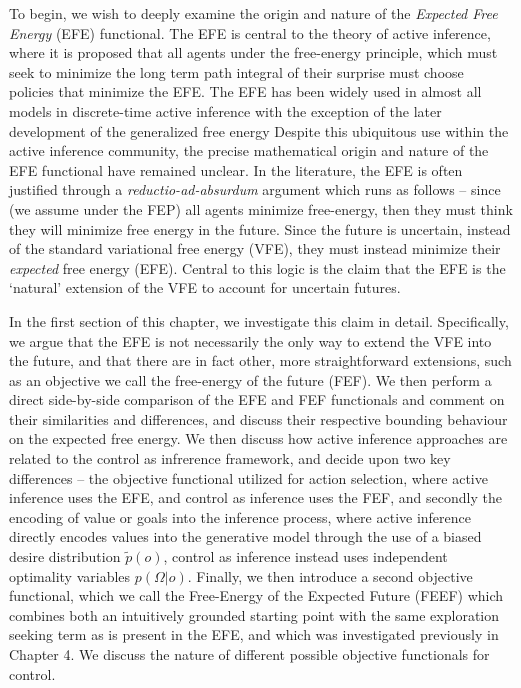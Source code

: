 To begin, we wish to deeply examine the origin and nature of the \emph{Expected Free Energy} (EFE) functional. The EFE is central to the theory of active inference, where it is proposed that all agents under the free-energy principle, which must seek to minimize the long term path integral of their surprise must choose policies that minimize the EFE. The EFE has been widely used in almost all models in discrete-time active inference \citep{friston_active_2015,friston2017active,friston2018deep,friston2017process,da2020active} with the exception of the later development of the generalized free energy \citep{friston2015active,parr2017uncertainty,parr2017active}%
 Despite this ubiquitous use within the active inference community, the precise mathematical origin and nature of the EFE functional have remained unclear. In the literature, the EFE is often justified through a \emph{reductio-ad-absurdum} argument \citep{friston2015active} which runs as follows -- since (we assume under the FEP) all agents minimize free-energy, then they must think they will minimize free energy in the future. Since the future is uncertain, instead of the standard variational free energy (VFE), they must instead minimize their \emph{expected} free energy (EFE). Central to this logic is the claim that the EFE is the `natural' extension of the VFE to account for uncertain futures. 

In the first section of this chapter, we investigate this claim in detail. Specifically, we argue that the EFE is not necessarily the only way to extend the VFE into the future, and that there are in fact other, more straightforward extensions, such as an objective we call the free-energy of the future (FEF). We then perform a direct side-by-side comparison of the EFE and FEF functionals and comment on their similarities and differences, and discuss their respective bounding behaviour on the expected free energy. We then discuss how active inference approaches are related to the control as infrerence framework, and decide upon two key differences -- the objective functional utilized for action selection, where active inference uses the EFE, and control as inference uses the FEF, and secondly the encoding of value or goals into the inference process, where active inference directly encodes values into the generative model through the use of a biased desire distribution $\tilde{p}(o)$, control as inference instead uses independent optimality variables $p(\Omega | o)$. Finally, we then introduce a second objective functional, which we call the Free-Energy of the Expected Future (FEEF) which combines both an intuitively grounded starting point with the same exploration seeking term as is present in the EFE, and which was investigated previously in Chapter 4. We discuss the nature of different possible objective functionals for control.


